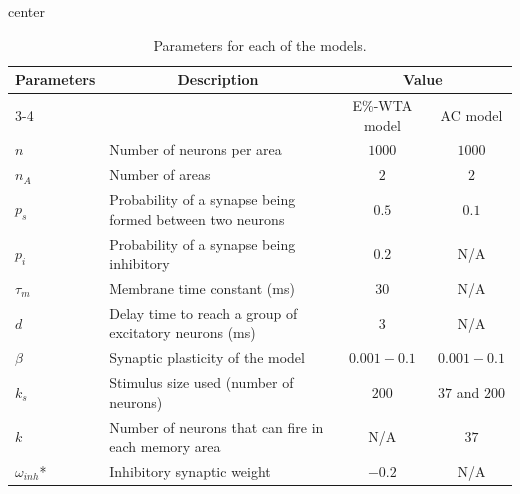 \documentclass[a4paper, 10pt]{article}
\begin{document}
\begin{table}[h]
\begin{adjustbox}{center}
\begin{tabular}{llcc}
\hline
\multicolumn{1}{c}{\multirow{2}{*}{Parameters}} & \multicolumn{1}{c}{\multirow{2}{*}{Description}}          & \multicolumn{2}{c}{Value}      \\ \cline{3-4} 
\multicolumn{1}{c}{}                            & \multicolumn{1}{c}{}                                      & E\%-WTA model & AC model       \\ \hline
$n$                                             & Number of neurons per area                                & $1000$        & $1000$         \\
$n_{A}$                                         & Number of areas                                           & $2$           & $2$            \\
$p_{s}$                                         & Probability of a synapse being formed between two neurons & $0.5$         & $0.1$          \\
$p_{i}$                                         & Probability of a synapse being inhibitory                 & $0.2$         & N/A            \\
$\tau_{m}$                                      & Membrane time constant (ms)                               & $30$          & N/A            \\
$d$                                             & Delay time to reach a group of excitatory neurons (ms)    & $3$           & N/A            \\
$\beta$                                         & Synaptic plasticity of the model                          & $0.001 - 0.1$ & $0.001 - 0.1$  \\
$k_{s}$                                         & Stimulus size used (number of neurons)                    & $200$         & $37$ and $200$ \\
$k$                                             & Number of neurons that can fire in each memory area       & N/A           & $37$           \\
$\omega_{inh}$*                                 & Inhibitory synaptic weight                                & $-0.2$        & N/A            \\ \hline
\end{tabular}
\end{adjustbox}
\caption{Parameters for each of the models.}
\label{tab:tb_2}
\end{table}
\end{document}
